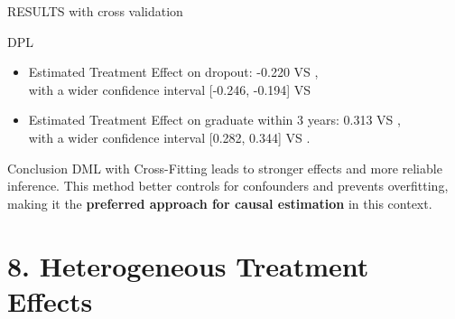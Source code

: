 \documentclass[aspectratio=169]{beamer}
\begin{document}
\begin{frame}{RESULTS with cross validation}

\vspace{20pt}
\begin{alertblock}{DPL}
	\begin{itemize}[label=--,itemsep=1pt,topsep=2pt]
	\item Estimated Treatment Effect on dropout: -0.220 VS ,\\ with a wider confidence interval [-0.246, -0.194] VS   
	\item Estimated Treatment Effect on graduate within 3 years:  0.313 VS ,\\ 
    with a wider confidence interval [0.282, 0.344] VS .

\end{itemize}
\end{alertblock}


\begin{exampleblock}{Conclusion}
\vspace{-2pt}
DML with Cross-Fitting  leads to stronger effects and more reliable inference. This method better controls for confounders and prevents overfitting, making it the \textbf{preferred approach for causal estimation} in this context.

\vspace{-3pt}
	
\end{exampleblock}

    
\end{frame}


\section{8. Heterogeneous Treatment Effects}
\end{document}

